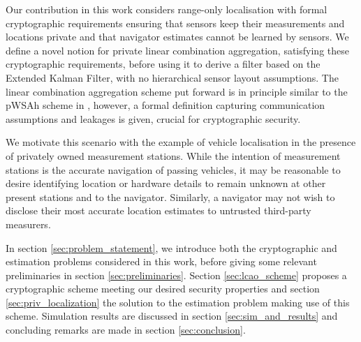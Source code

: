 \documentclass[10pt,letterpaper,oneside,twocolumn,journal]{IEEEtran}
\theoremstyle{definition}
\theoremstyle{definition}
\theoremstyle{remark}
\begin{document}
Our contribution in this work considers range-only localisation with formal cryptographic requirements ensuring that sensors keep their measurements and locations private and that navigator estimates cannot be learned by sensors. We define a novel notion for private linear combination aggregation, satisfying these cryptographic requirements, before using it to derive a filter based on the Extended Kalman Filter, with no hierarchical sensor layout assumptions. The linear combination aggregation scheme put forward is in principle similar to the pWSAh scheme in \cite{alexandruPrivateWeightedSum2020}, however, a formal definition capturing communication assumptions and leakages is given, crucial for cryptographic security.

We motivate this scenario with the example of vehicle localisation in the presence of privately owned measurement stations. While the intention of measurement stations is the accurate navigation of passing vehicles, it may be reasonable to desire identifying location or hardware details to remain unknown at other present stations and to the navigator. Similarly, a navigator may not wish to disclose their most accurate location estimates to untrusted third-party measurers.

In section \ref{sec:problem_statement}, we introduce both the cryptographic and estimation problems considered in this work, before giving some relevant preliminaries in section \ref{sec:preliminaries}. Section \ref{sec:lcao_scheme} proposes a cryptographic scheme meeting our desired security properties and section \ref{sec:priv_localization} the solution to the estimation problem making use of this scheme. Simulation results are discussed in section \ref{sec:sim_and_results} and concluding remarks are made in section \ref{sec:conclusion}.

% 
% 
\end{document}
